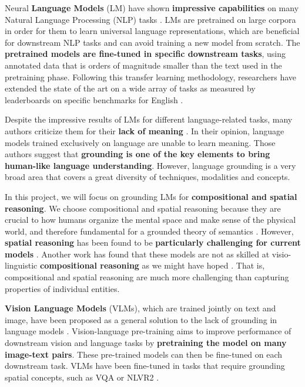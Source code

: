 Neural \textbf{Language Models} (LM) have shown \textbf{impressive capabilities} on many Natural Language Processing (NLP) tasks \cite{wang2019superglue, brown2020language, chowdhery2022palm}. LMs are pretrained on large corpora in order for them to learn universal language representations, which are beneficial for downstream NLP tasks and can avoid training a new model from scratch. The \textbf{pretrained models are fine-tuned in specific downstream tasks}, using annotated data that is orders of magnitude smaller than the text used in the pretraining phase. Following this transfer learning methodology, researchers have extended the state of the art on a wide array of tasks as measured by leaderboards on specific benchmarks for English \cite{bommasani2021opportunities, wang2019superglue}.

Despite the impressive results of LMs for different language-related tasks, many authors criticize them for their \textbf{lack of meaning} \cite{bender2020climbing, bender2021dangers}. In their opinion, language models trained exclusively on language are unable to learn meaning. Those authors suggest that \textbf{grounding is one of the key elements to bring human-like language understanding}. However, language grounding is a very broad area that covers a great diversity of techniques, modalities and concepts. 

In this project, we will focus on grounding LMs for \textbf{compositional and spatial reasoning}. We choose compositional and spatial reasoning because they are crucial to how humans organize the mental space and make sense of the physical world, and therefore fundamental for a grounded theory of semantics \cite{levinson2003space}. However, \textbf{spatial reasoning} has been found to be \textbf{particularly challenging for current models} \cite{akula2020words}. Another work has found that these models are not as skilled at visio-linguistic \textbf{compositional reasoning} as we might have hoped \cite{thrush2022winoground}. That is, compositional and spatial reasoning are much more challenging than capturing properties of individual entities.

\textbf{Vision Language Models} (VLMs), which are trained jointly on text and image, have been proposed as a general solution to the lack of grounding in language models \cite{lu2019vilbert, tan2020lxmert, ramesh2022hierarchical, saharia2022photorealistic}. Vision-language pre-training aims to improve performance of downstream vision and language tasks by \textbf{pretraining the model on many image-text pairs}. These pre-trained models can then be fine-tuned on each downstream task. VLMs have been fine-tuned in tasks that require grounding spatial concepts, such as VQA \cite{antol2015vqa} or NLVR2 \cite{suhr2018corpus}.

